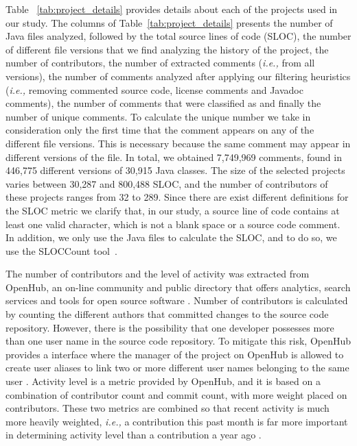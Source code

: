 Table ~\ref{tab:project_details} provides details about each of the projects used in our study. The columns of Table~\ref{tab:project_details} presents the number of Java files analyzed, followed by the total source lines of code (SLOC), the number of different file versions that we find analyzing the history of the project, the number of contributors, the number of extracted comments (\textit{i.e.,} from all versions), the number of comments analyzed after applying our filtering heuristics (\textit{i.e.,} removing commented source code, license comments and Javadoc comments), the number of comments that were classified as \SATD and finally the number of unique \SATD comments. To calculate the unique \SATD number we take in consideration only the first time that the comment appears on any of the different file versions. This is necessary because the same comment may appear in different versions of the file. In total, we obtained 7,749,969 comments, found in 446,775 different versions of 30,915 Java classes. The size of the selected projects varies between 30,287 and 800,488 SLOC, and the number of contributors of these projects ranges from 32 to 289. Since there are exist different definitions for the SLOC metric we clarify that, in our study, a source line of code contains at least one valid character, which is not a blank space or a source code comment. In addition, we only use the Java files to calculate the SLOC, and to do so, we use the SLOCCount tool~\cite{wheeler2004:home}. 

 
The number of contributors and the level of activity was extracted from OpenHub, an on-line community and public directory that offers analytics, search services and tools for open source software \cite{Openhub:home}. Number of contributors is calculated by counting the different authors that committed changes to the source code repository. However, there is the possibility that one developer possesses more than one user name in the source code repository. To mitigate this risk, OpenHub provides a interface where the manager of the project on OpenHub is allowed to create user aliases to link two or more different user names belonging to the same user \cite{Openhub:Aliases}. Activity level is a metric provided by OpenHub, and it is based on a combination of contributor count and commit count, with more weight placed on contributors. These two metrics are combined so that recent activity is much more heavily weighted, \textit{i.e.,} a contribution this past month is far more important in determining activity level than a contribution a year ago \cite{Openhub:activity_level}. 


